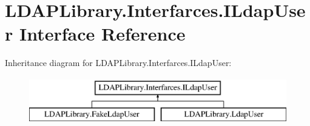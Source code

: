 \hypertarget{interface_l_d_a_p_library_1_1_interfarces_1_1_i_ldap_user}{}\section{L\+D\+A\+P\+Library.\+Interfarces.\+I\+Ldap\+User Interface Reference}
\label{interface_l_d_a_p_library_1_1_interfarces_1_1_i_ldap_user}
Inheritance diagram for L\+D\+A\+P\+Library.\+Interfarces.\+I\+Ldap\+User\+:\begin{figure}[H]
\begin{center}
\leavevmode
\includegraphics[height=2.000000cm]{interface_l_d_a_p_library_1_1_interfarces_1_1_i_ldap_user}
\end{center}
\end{figure}
